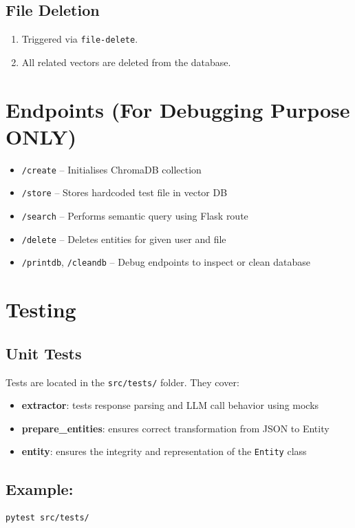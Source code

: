 \subsection{File Deletion}
\begin{enumerate}
    \item Triggered via \texttt{file-delete}.
    \item All related vectors are deleted from the database.
\end{enumerate}

\section{Endpoints (For Debugging Purpose ONLY)}
\begin{itemize}
    \item \texttt{/create} -- Initialises ChromaDB collection
    \item \texttt{/store} -- Stores hardcoded test file in vector DB
    \item \texttt{/search} -- Performs semantic query using Flask route
    \item \texttt{/delete} -- Deletes entities for given user and file
    \item \texttt{/printdb}, \texttt{/cleandb} -- Debug endpoints to inspect or clean database
\end{itemize}

\section{Testing}

\subsection{Unit Tests}
Tests are located in the \texttt{src/tests/} folder. They cover:
\begin{itemize}
    \item \textbf{extractor}: tests response parsing and LLM call behavior using mocks
    \item \textbf{prepare\_entities}: ensures correct transformation from JSON to Entity
    \item \textbf{entity}: ensures the integrity and representation of the \texttt{Entity} class
\end{itemize}

\subsection{Example:}
\begin{verbatim}
pytest src/tests/
\end{verbatim}

